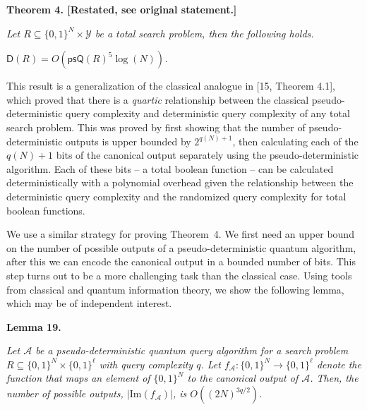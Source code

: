 \par\medskip\noindent\textbf{
\textbf{Theorem 4}\textbf{.}
[Restated, see original statement.]}\par



\emph{Let ${R}\subseteq\{0,1\}^{N}\times\mathcal{Y}$ be a total search problem, then the following holds.}\par




$\mathsf{D}(R)=O(\mathsf{psQ}(R)^{5}\log(N))$\emph{.}\par







This result is a generalization of the classical analogue in [15, Theorem 4.1], which proved that there is a \emph{quartic} relationship between the classical pseudo-deterministic query complexity and deterministic query complexity of any total search problem. This was proved by first showing that the number of pseudo-deterministic outputs is upper bounded by $2^{q(N)+1}$, then calculating each of the $q(N)+1$ bits of the canonical output separately using the pseudo-deterministic algorithm. Each of these bits – a total boolean function – can be calculated deterministically with a polynomial overhead given the relationship between the deterministic query complexity and the randomized query complexity for total boolean functions.\par




We use a similar strategy for proving Theorem 4. We first need an upper bound on the number of possible outputs of a pseudo-deterministic quantum algorithm, after this we can encode the canonical output in a bounded number of bits.
This step turns out to be a more challenging task than the classical case. Using tools from classical and quantum information theory, we show the following lemma, which may be of independent interest.\par





\par\medskip\noindent\textbf{
\textbf{Lemma 19}\textbf{.}
}\par



\emph{Let $\mathcal{A}$ be a pseudo-deterministic quantum query algorithm for a search problem $R\subseteq\{0,1\}^{N}\times\{0,1\}^{\ell}$ with query complexity $q$. Let $f_{\mathcal{A}}:\{0,1\}^{N}\rightarrow\{0,1\}^{\ell}$
denote the function that maps an element of $\{0,1\}^{N}$ to the canonical output of $\mathcal{A}$.
Then, the number of possible outputs, $|\mathrm{Im}(f_{\mathcal{A}})|$, is $O((2N)^{3q/2})$.}\par



